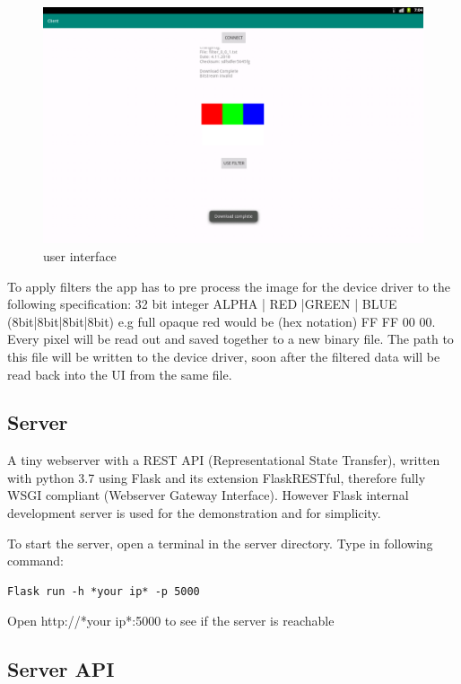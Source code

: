 \begin{figure}[h]
\centering
\includegraphics[width=1\textwidth]{sections/methodology/client_download.png}
\caption{\label{fig:gic} user interface}
\end{figure}

To apply filters the app has to pre process the image for  the device driver to the following specification:
32 bit integer
ALPHA | RED |GREEN | BLUE (8bit|8bit|8bit|8bit) e.g full opaque red would be (hex notation) FF FF 00 00. Every pixel will be read out and saved together to a new binary file. 
The path to this file will be written to the device driver, soon after the filtered data will be read back into the UI from the same file.


\subsection{Server}

A tiny webserver with a REST API (Representational State Transfer), 
written with python 3.7 using Flask and its extension FlaskRESTful, therefore fully WSGI compliant
(Webserver Gateway Interface). However Flask internal development server is used for the demonstration and for simplicity.

To start the server, open a terminal in the server directory. Type in following command:
\begin{verbatim}
Flask run -h *your ip* -p 5000    
\end{verbatim}
Open http://*your ip*:5000 to see if the server is reachable

\subsection{Server API}

